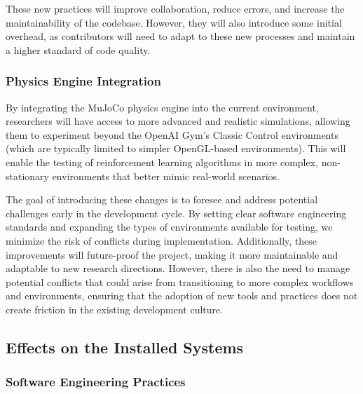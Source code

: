 \documentclass[12pt]{article}
\begin{document}
These new practices will improve collaboration, reduce errors, and increase the maintainability of the codebase. However, they will also introduce some initial overhead, as contributors will need to adapt to these new processes and maintain a higher standard of code quality.

\subsubsection{Physics Engine Integration}

By integrating the MuJoCo physics engine into the current environment, researchers will have access to more advanced and realistic simulations, allowing them to experiment beyond the OpenAI Gym's Classic Control environments (which are typically limited to simpler OpenGL-based environments). This will enable the testing of reinforcement learning algorithms in more complex, non-stationary environments that better mimic real-world scenarios.

The goal of introducing these changes is to foresee and address potential challenges early in the development cycle. By setting clear software engineering standards and expanding the types of environments available for testing, we minimize the risk of conflicts during implementation. Additionally, these improvements will future-proof the project, making it more maintainable and adaptable to new research directions. However, there is also the need to manage potential conflicts that could arise from transitioning to more complex workflows and environments, ensuring that the adoption of new tools and practices does not create friction in the existing development culture.

\subsection{Effects on the Installed Systems}

\subsubsection{Software Engineering Practices}
\end{document}
